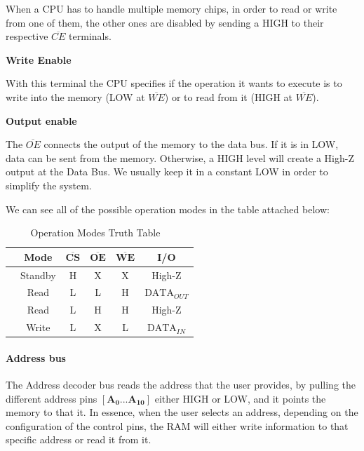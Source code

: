 When a CPU has to handle multiple memory chips, in order to read or write from one of them, the other ones are disabled by sending a HIGH to their respective $\overline{CE}$ terminals. \medskip

\textbf{Write Enable} \medskip

With this terminal the CPU specifies if the operation it wants to execute is to write into the memory (LOW at $\overline{WE}$) or to read from it (HIGH at $\overline{WE}$).\medskip


\textbf{Output enable} \medskip

The $\overline{OE}$ connects the output of the memory to the data bus. If it is in LOW, data can be sent from the memory. Otherwise, a HIGH level will create a High-Z output at the Data Bus.  We usually keep it in a constant LOW in order to simplify the system.\medskip

We can see all of the possible operation modes in the table attached below: 

\begin{table}[H]
    \centering
        \begin{tabular}[t]{lccccc}
            \toprule
            & \textbf{Mode} & $\mathbf{\overline{CS}}$ & $\mathbf{\overline{OE}}$ & $\mathbf{\overline{WE}}$ & \textbf{I/O}\\
            \midrule
                &    Standby   &    H   &   X   &   X   &   High-Z        \\
                &    Read      &    L   &   L   &   H   &   $\text{DATA}_{OUT}$    \\
                &    Read      &    L   &   H   &   H   &   High-Z        \\
                &    Write     &    L   &   X   &   L   &   $\text{DATA}_{IN}$     \\
            \bottomrule
        \end{tabular}
        \caption{Operation Modes Truth Table ~\autocite{6116}}
        \label{table: RAM_MODES}
\end{table}

\clearpage

\paragraph{Address bus}

The Address decoder bus reads the address that the user provides, by pulling the different address pins $\mathbf{\left[ A_0...A_{10} \right]}$ either HIGH or LOW, and it points the memory to that it. In essence, when the user selects an address, depending on the configuration of the control pins, the RAM will either write information to that specific address or read it from it. 


